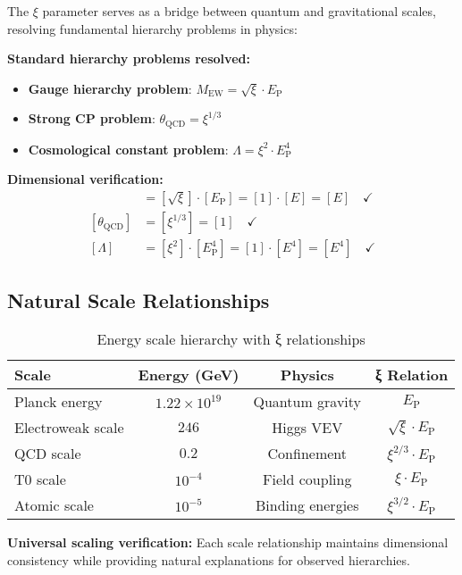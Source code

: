 \documentclass[12pt,a4paper]{report}
\newcommand{\EP}{E_{\text{P}}}            %
\begin{document}
The $\xi$ parameter serves as a bridge between quantum and gravitational scales, resolving fundamental hierarchy problems in physics:

\textbf{Standard hierarchy problems resolved:}
\begin{itemize}
	\item \textbf{Gauge hierarchy problem}: $M_{\text{EW}} = \sqrt{\xi} \cdot \EP$
	\item \textbf{Strong CP problem}: $\theta_{\text{QCD}} = \xi^{1/3}$
	\item \textbf{Cosmological constant problem}: $\Lambda = \xi^2 \cdot \EP^4$
\end{itemize}

\textbf{Dimensional verification:}
\begin{align}
	[M_{\text{EW}}] &= [\sqrt{\xi}] \cdot [\EP] = [1] \cdot [E] = [E] \quad \checkmark \\
	[\theta_{\text{QCD}}] &= [\xi^{1/3}] = [1] \quad \checkmark \\
	[\Lambda] &= [\xi^2] \cdot [\EP^4] = [1] \cdot [E^4] = [E^4] \quad \checkmark
\end{align}

\subsection{Natural Scale Relationships}
\label{subsec:natural_scale_relationships}

\begin{table}[htbp]
	\centering
	\begin{tabular}{lccc}
		\toprule
		\textbf{Scale} & \textbf{Energy (GeV)} & \textbf{Physics} & \textbf{ξ Relation} \\
		\midrule
		Planck energy & $1.22 \times 10^{19}$ & Quantum gravity & $\EP$ \\
		Electroweak scale & $246$ & Higgs VEV & $\sqrt{\xi} \cdot \EP$ \\
		QCD scale & $0.2$ & Confinement & $\xi^{2/3} \cdot \EP$ \\
		T0 scale & $10^{-4}$ & Field coupling & $\xi \cdot \EP$ \\
		Atomic scale & $10^{-5}$ & Binding energies & $\xi^{3/2} \cdot \EP$ \\
		\bottomrule
	\end{tabular}
	\caption{Energy scale hierarchy with ξ relationships}
	\label{tab:energy_scales}
\end{table}

\textbf{Universal scaling verification:}
Each scale relationship maintains dimensional consistency while providing natural explanations for observed hierarchies.
\end{document}
